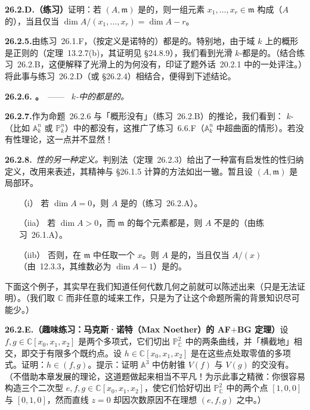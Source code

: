 \textbf{26.2.D.（练习）}\quad 证明：若 $(A,\mathfrak{m})$ 是\trCM{}的，则一组元素 $x_1,\dots,x_r\in\mathfrak{m}$ 构成（$A$ 的）\trRegularSequence，当且仅当 $\dim A/(x_1,\dots,x_r)=\dim A-r$。

\textbf{26.2.5.}\quad 由\mbox{练习~26.1.F}，\trRegular\trLocalRing（按定义是诺特的）都是\trCM{}的。特别地，由于域 $k$ 上的\trSmooth{}概形是正则的（\mbox{定理~13.2.7(b)}，其证明见 \S24.8.9），我们看到光滑 $k$-\trScheme{}都是\trCM{}的。（结合\mbox{练习~26.2.B}，这便解释了光滑\trVariety{}上的\trEffectiveCartierDivisor{}为何没有\trEmbeddedPoint，印证了\mbox{题外话~20.2.1} 中的一处评注。）将此事与\mbox{练习~26.2.D}（或 \S26.2.4）相结合，便得到下述结论。

\textbf{26.2.6. \trhProposition。}\ ——\ \emph{\trSmooth{} $k$-\trScheme{}中的\trRegularEmbedding{}都是\trCM{}的。}

\textbf{26.2.7.}\quad 作为\mbox{命题~26.2.6} 与「\trCM{}概形没有\trEmbeddedPoint」（\mbox{练习~26.2.B}）的推论，我们看到：\trSmooth{} $k$-\trScheme{}（比如 $\mathbb{A}^n_k$ 或 $\mathbb{P}^n_k$）中的\trRegularEmbedding{}都没有\trEmbeddedPoint，这推广了\mbox{练习~6.6.F}（$\mathbb{A}^n_k$ 中超曲面的情形）。若没有\trCM{}性理论，这一点并不显然！

\textbf{26.2.8.}\ \emph{\trCM{}性的另一种定义。}\quad \trSlicing{}判别法（\mbox{定理~26.2.3}）给出了一种富有启发性的\trCM{}性归纳定义，改用\trEffectiveCartierDivisor{}来表述，其精神与 \S26.1.5 计算\trDepth{}的方法如出一辙。暂且设 $(A,\mathfrak{m})$ 是\trNoether{}局部环。
\begin{itemize}
\item[（i）] 若 $\dim A=0$，则 $A$ 是\trCM{}的（\mbox{练习~26.2.A}）。
\item[（iia）] 若 $\dim A>0$，而 $\mathfrak{m}$ 的每个元素都是\trZerodivisor，则 $A$ 不是\trCM{}的（由\mbox{练习~26.1.A}）。
\item[（iib）] 否则，在 $\mathfrak{m}$ 中任取一个\trNonZerodivisor{} $x$。则 $A$ 是\trCM{}的，当且仅当 $A/(x)$（由\mbox{\trKrull{}\trPrincipalIdealTheorem~12.3.3}，其维数必为 $\dim A-1$）是\trCM{}的。
\end{itemize}

下面这个例子，其实早在我们知道任何代数几何之前就可以陈述出来（只是无法证明）。（我们取 $\mathbb{C}$ 而非任意的域来工作，只是为了让这个命题所需的背景知识尽可能少。）

\textbf{26.2.E.（趣味练习：马克斯·诺特（Max Noether）的 AF$+$BG 定理）}\quad 设 $f,g\in\mathbb{C}[x_0,x_1,x_2]$ 是两个\trHomogeneous{}多项式，它们切出 $\mathbb{P}^2_{\mathbb{C}}$ 中的两条曲线，并「横截地」相交，即交于有限多个既约点。设 $h\in\mathbb{C}[x_0,x_1,x_2]$ 是在这些点处取零值的\trHomogeneous{}多项式。证明：$h\in(f,g)$。提示：证明 $\mathbb{A}^3$ 中仿射锥 $V(f)$ 与 $V(g)$ 的交没有\trEmbeddedPoint。（不借助本章发展的理论，这道题做起来相当不平凡！为示此事之精微：你很容易构造三个二次型 $e,f,g\in\mathbb{C}[x_0,x_1,x_2]$，使它们恰好切出 $\mathbb{P}^2_{\mathbb{C}}$ 中的两个点 $[1,0,0]$ 与 $[0,1,0]$，然而直线 $z=0$ 却因次数原因不在理想 $(e,f,g)$ 之中。）

